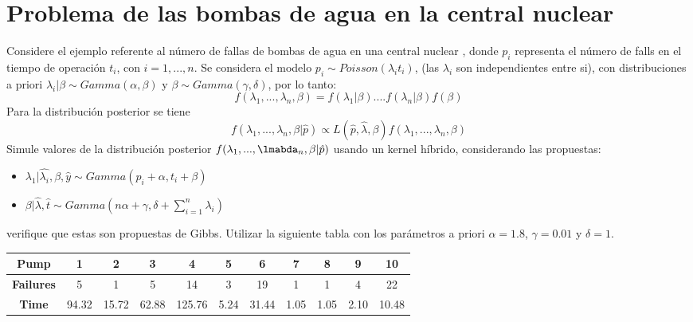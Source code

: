 \documentclass[preprint,12pt]{elsarticle}
\begin{document}
\section{Problema de las bombas de agua en la central nuclear}
Considere el ejemplo referente al número de fallas de bombas de agua en una central nuclear \cite{robert2010introducing} \cite{norton2018sampling}, donde $p_i$ representa el número de falls en el tiempo de operación $t_i$, con $i=1, ..., n$.
%
Se considera el modelo $p_i \sim Poisson(\lambda_i t_i)$, (las $\lambda_i$ son independientes entre si), con distribuciones a priori $\lambda_i | \beta \sim Gamma(\alpha, \beta)$ y $\beta \sim Gamma(\gamma, \delta)$, por lo tanto:
\begin{equation}
    f(\lambda_1, ..., \lambda_n, \beta) = f(\lambda_1 | \beta)....f(\lambda_n | \beta) f(\beta)
\end{equation}
Para la distribución posterior se tiene
\begin{equation}
    f(\lambda_1, ..., \lambda_n, \beta | \hat{p}) \propto L(\hat{p}, \hat{\lambda}, \beta) f(\lambda_1,...,\lambda_n , \beta) 
\end{equation}
Simule valores de la distribución posterior $f(\lambda_1, ..., \lmabda_n, \beta | \hat{p})$ usando un kernel híbrido, considerando las propuestas:
\begin{itemize}
    \item $\lambda_1 | \hat{\lambda_i}, \beta, \hat{y} \sim Gamma(p_i + \alpha, t_i + \beta)$
    \item $\beta | \hat{\lambda}, \hat{t} \sim Gamma( n \alpha + \gamma, \delta + \sum_{i=1}^n \lambda_i  )$
\end{itemize}
verifique que estas son propuestas de Gibbs. Utilizar la siguiente tabla con los parámetros a priori $\alpha=1.8$, $\gamma = 0.01$ y $\delta=1$.

\begin{table}[H]
\begin{tabular}{|c|c|c|c|c|c|c|c|c|c|c|}
\hline
\textbf{Pump}     & 1     & 2     & 3     & 4      & 5    & 6     & 7    & 8    & 9    & 10    \\ \hline
\textbf{Failures} & 5     & 1     & 5     & 14     & 3    & 19    & 1    & 1    & 4    & 22    \\ \hline
\textbf{Time}     & 94.32 & 15.72 & 62.88 & 125.76 & 5.24 & 31.44 & 1.05 & 1.05 & 2.10 & 10.48 \\ \hline
\end{tabular}
\end{table}
\end{document}
